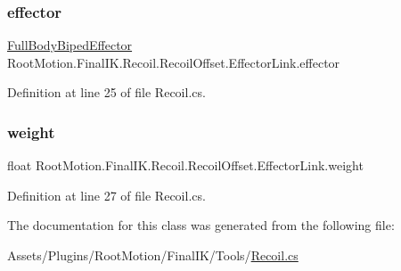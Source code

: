 \subsubsection{\texorpdfstring{effector}{effector}}
{\footnotesize\ttfamily \mbox{\hyperlink{namespace_root_motion_1_1_final_i_k_ae0dd2058c7667b6f132c11a6b860c14a}{Full\+Body\+Biped\+Effector}} Root\+Motion.\+Final\+I\+K.\+Recoil.\+Recoil\+Offset.\+Effector\+Link.\+effector}



Definition at line 25 of file Recoil.\+cs.

\mbox{\label{class_root_motion_1_1_final_i_k_1_1_recoil_1_1_recoil_offset_1_1_effector_link_a70cfbea6d66d9cb118a930ef8498f4ab}} 
\subsubsection{\texorpdfstring{weight}{weight}}
{\footnotesize\ttfamily float Root\+Motion.\+Final\+I\+K.\+Recoil.\+Recoil\+Offset.\+Effector\+Link.\+weight}



Definition at line 27 of file Recoil.\+cs.



The documentation for this class was generated from the following file\+:\begin{DoxyCompactItemize}
\item 
Assets/\+Plugins/\+Root\+Motion/\+Final\+I\+K/\+Tools/\mbox{\hyperlink{_recoil_8cs}{Recoil.\+cs}}\end{DoxyCompactItemize}
